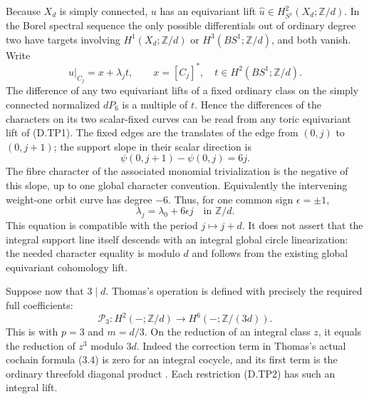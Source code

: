 Because $X_d$ is simply connected, $u$ has an equivariant
lift $\widehat u\in H^2_{S^1}(X_d;\mathbb Z/d)$.
In the Borel spectral sequence the only possible
differentials out of ordinary degree two have targets
involving $H^1(X_d;\mathbb Z/d)$ or $H^3(BS^1;\mathbb Z/d)$,
and both vanish. Write
\[
         \widehat u|_{C_j}=x+\lambda_j t,
         \qquad x=[C_j]^*,\quad t\in H^2(BS^1;\mathbb Z/d).
                                                               \tag{D.TP2}
\]
The difference of any two equivariant lifts of a fixed
ordinary class on the simply connected normalized
$dP_6$ is a multiple of $t$. Hence the differences of
the characters on its two scalar-fixed curves can be
read from any toric equivariant lift of (D.TP1).
The fixed edges are the translates of the edge from
$(0,j)$ to $(0,j+1)$; the support slope in their scalar
direction is
\[
               \psi(0,j+1)-\psi(0,j)=6j.
                                                               \tag{D.TP3}
\]
The fibre character of the associated monomial
trivialization is the negative of this slope, up to
one global character convention. Equivalently the
intervening weight-one orbit curve has degree $-6$.
Thus, for one common sign $\epsilon=\pm1$,
\[
                    \lambda_j=\lambda_0+6\epsilon j
                                 \quad\text{in }\mathbb Z/d.
                                                               \tag{D.TP4}
\]
This equation is compatible with the period $j\mapsto j+d$.
It does not assert that the integral support line itself
descends with an integral global circle linearization:
the needed character equality is modulo $d$ and follows
from the existing global equivariant cohomology lift.

Suppose now that $3\mid d$. Thomas's operation is defined
with precisely the required full coefficients:
\[
 \mathcal P_3:H^2(-;\mathbb Z/d)
                    \longrightarrow H^6(-;\mathbb Z/(3d)).
                                                               \tag{D.TP5}
\]
This is \cite[equation (2.1), p.267]{ffThomas56} with
$p=3$ and $m=d/3$. On the reduction of an integral
class $z$, it equals the reduction of $z^3$ modulo
$3d$. Indeed the correction term in Thomas's actual
cochain formula (3.4) is zero for an integral cocycle,
and its first term is the ordinary threefold diagonal
product \cite[equations (3.4)--(3.6), p.268]{ffThomas56}.
Each restriction (D.TP2) has such an integral lift.

